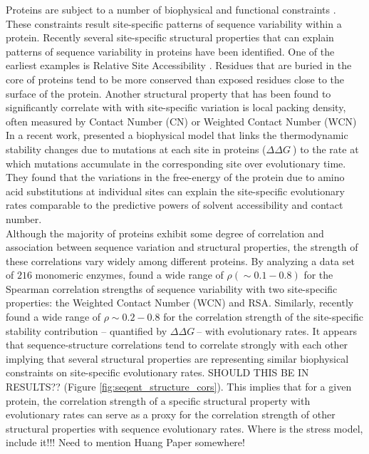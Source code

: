 \documentclass[12pt]{article}
\newcommand{\ddg}{$\Delta\Delta G~$}
\begin{document}
Proteins are subject to a number of biophysical and functional constraints \citep{Scherreretal2012, Wilkeetal2010}. These constraints result site-specific patterns of sequence variability within a protein. Recently several site-specific structural properties that can explain patterns of sequence variability in proteins have been identified. One of the earliest examples is Relative Site Accessibility \citep{Ramseyetal2011, Fransozaetal2009}. Residues that are buried in the core of proteins tend to be more conserved than exposed residues close to the surface of the protein.  Another structural property that has been found to significantly correlate with with site-specific variation is local packing density, often measured by Contact Number (CN) or Weighted Contact Number (WCN) \citep{Liaoetal2005, Yehetal2014, Huangetal2014}\\
\indent In a recent work, \cite{Echaveetal2015} presented a biophysical model that links the thermodynamic stability changes due to mutations at each site in proteins (\ddg)  to the rate at which mutations accumulate in the corresponding site over evolutionary time. They found that the variations in the free-energy of the protein due to amino acid substitutions at individual sites can explain the site-specific evolutionary rates comparable to the predictive powers of solvent accessibility and contact number. \\
\indent Although the majority of proteins exhibit some degree of correlation and association between sequence variation and structural properties, the strength of these correlations vary widely among different proteins. By analyzing a data set of $216$ monomeric enzymes, \cite{Yehetal2014} found a wide range of $\rho (\sim0.1-0.8)$ for the Spearman correlation strengths of sequence variability with two site-specific properties: the Weighted Contact Number (WCN) and RSA. Similarly, \cite{Echaveetal2015} recently found a wide range of $\rho\sim0.2-0.8$ for the correlation strength of the site-specific stability contribution -- quantified by \ddg -- with evolutionary rates. {\color{blue} It appears that sequence-structure correlations tend to correlate strongly with each other implying that several structural properties are representing similar biophysical constraints on site-specific evolutionary rates. SHOULD THIS BE IN RESULTS??} (Figure \ref{fig:seqent_structure_cors}). This implies that for a given protein, the correlation strength of a specific structural property with evolutionary rates can serve as a proxy for the correlation strength of other structural properties with sequence evolutionary rates. {\color{red} Where is the stress model, include it!!! Need to mention Huang Paper somewhere!}\\
\end{document}
